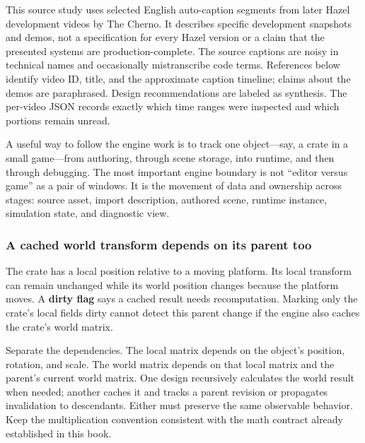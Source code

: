 \hypertarget{06-engine-ii-ch032-evidence-boundary}{}

This source study uses selected English auto-caption segments from later Hazel development videos by The Cherno. It describes specific development snapshots and demos, not a specification for every Hazel version or a claim that the presented systems are production-complete. The source captions are noisy in technical names and occasionally mistranscribe code terms. References below identify video ID, title, and the approximate caption timeline; claims about the demos are paraphrased. Design recommendations are labeled as synthesis. The per-video JSON records exactly which time ranges were inspected and which portions remain unread.

A useful way to follow the engine work is to track one object---say, a crate in a small game---from authoring, through scene storage, into runtime, and then through debugging. The most important engine boundary is not ``editor versus game'' as a pair of windows. It is the movement of data and ownership across stages: source asset, import description, authored scene, runtime instance, simulation state, and diagnostic view.

\subsubsection{A cached world transform depends on its parent too}\label{06-engine-ii-ch032-a-cached-world-transform-depends-on-its-parent-too}

\hypertarget{06-engine-ii-ch032-a-cached-world-transform-depends-on-its-parent-too}{}

The crate has a local position relative to a moving platform. Its local transform can remain unchanged while its world position changes because the platform moves. A \textbf{dirty flag} says a cached result needs recomputation. Marking only the crate's local fields dirty cannot detect this parent change if the engine also caches the crate's world matrix.

Separate the dependencies. The local matrix depends on the object's position, rotation, and scale. The world matrix depends on that local matrix and the parent's current world matrix. One design recursively calculates the world result when needed; another caches it and tracks a parent revision or propagates invalidation to descendants. Either must preserve the same observable behavior. Keep the multiplication convention consistent with the math contract already established in this book.

